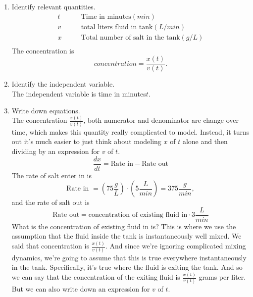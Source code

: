 \begin{enumerate}
\item Identify relevant quantities.
  \begin{align*}
    t &\qquad \text{Time in minutes} (min) \\    
    v &\qquad \text{total liters fluid in tank} (L/min) \\
    x &\qquad \text{Total number of salt in the tank} (g/L) \\
  \end{align*}
  The concentration is
  \begin{equation*}
    \displaystyle concentration = \frac{x(t)}{v(t)}. 
  \end{equation*}
\item Identify the independent variable.\\
  The independent variable is time in minutes$t$.
\item Write down equations. \\
  The concentration $\displaystyle \frac{x(t)}{v(t)}$, both numerator and denominator are change
  over time, which makes this quantity really complicated to model.
  Instead, it turns out it's much easier to just think about modeling $x$ of $t$ alone
  and then dividing by an expression for $v$ of $t$.
  \begin{equation*}
    \displaystyle \frac{dx}{dt} = \text{Rate in} - \text{Rate out}
  \end{equation*}
  The rate of salt enter in is
  \begin{equation*}
    \displaystyle \text{Rate in } = (75 \frac{g}{L}) \cdot (5 \frac{L}{min}) = 375 \frac{g}{min},
  \end{equation*}
  and the rate of salt out is
  \begin{equation}
    \label{eq:1}
    \displaystyle \text{Rate out} = \text{concentration of existing fluid in} \cdot 3 \frac{L}{min} 
  \end{equation}
  What is the concentration of existing fluid in is?
  This is where we use the assumption that the fluid inside the tank is instantaneously well mixed.
  We said that concentration is $\displaystyle \frac{x(t)}{v(t)}$.
  And since we're ignoring complicated mixing dynamics, we're going to assume that this is true everywhere
  instantaneously in the tank.
  Specifically, it's true where the fluid is exiting the tank.
  And so we can say that the concentration of {\color{orange}the exiting fluid} is
  $\displaystyle \frac{x(t)}{v(t)}$ grams per liter.
  But we can also write down an expression for $v$ of $t$.

\end{enumerate}

